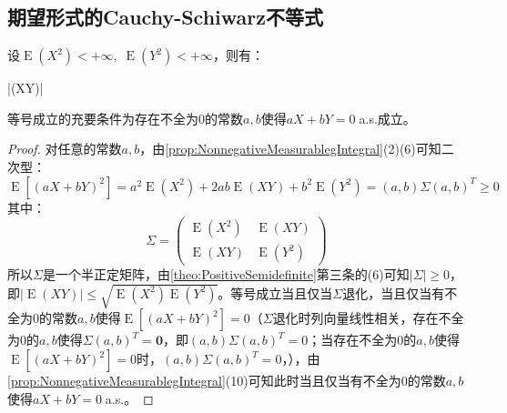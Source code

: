 \subsection{期望形式的Cauchy-Schiwarz不等式}
\begin{theorem}
	设$\operatorname{E}(X^2)<+\infty,\;\operatorname{E}(Y^2)<+\infty$，则有：
	\begin{inequality*}\label{ineq:cauchy-schiwarz-expectations}
		|(XY)|\leqslant{}
	\end{inequality*}
	等号成立的充要条件为存在不全为$0$的常数$a,b$使得$aX+bY=0\;$a.s.成立。
\end{theorem}
\begin{proof}
	对任意的常数$a,b$，由\cref{prop:NonnegativeMeasurablegIntegral}(2)(6)可知二次型：
	\begin{equation*}
		\operatorname{E}[(aX+bY)^2]=a^2\operatorname{E}(X^2)+2ab\operatorname{E}(XY)+b^2\operatorname{E}(Y^2)=(a,b)\Sigma(a,b)^T\geqslant0
	\end{equation*}
	其中：
	\begin{equation*}
		\Sigma=
		\begin{pmatrix}
			\operatorname{E}(X^2) & \operatorname{E}(XY) \\
			\operatorname{E}(XY) & \operatorname{E}(Y^2)
		\end{pmatrix}
	\end{equation*}
	所以$\Sigma$是一个半正定矩阵，由\cref{theo:PositiveSemidefinite}第三条的(6)可知$|\Sigma|\geqslant0$，即$|\operatorname{E}(XY)|\leqslant\sqrt{\operatorname{E}(X^2)\operatorname{E}(Y^2)}$。等号成立当且仅当$\Sigma$退化，当且仅当有不全为$0$的常数$a,b$使得$\operatorname{E}[(aX+bY)^2]=0$（$\Sigma$退化时列向量线性相关，存在不全为$0$的$a,b$使得$\Sigma(a,b)^T=\mathbf{0}$，即$(a,b)\Sigma(a,b)^T=0$；当存在不全为$0$的$a,b$使得$\operatorname{E}[(aX+bY)^2]=0$时，$(a,b)\Sigma(a,b)^T=0$，），由\cref{prop:NonnegativeMeasurablegIntegral}(10)可知此时当且仅当有不全为$0$的常数$a,b$使得$aX+bY=0\;$a.s.。
\end{proof}

